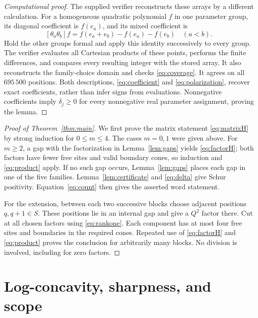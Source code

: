\documentclass[11pt]{article}
\begin{document}
\begin{proof}[Computational proof]
The supplied verifier reconstructs these arrays by a different calculation.
For a homogeneous quadratic polynomial $f$ in one parameter group,
its diagonal coefficient is $f(e_a)$, and its mixed coefficient is
\begin{equation}\label{eq:polarization}
 [\theta_a\theta_b]f=f(e_a+e_b)-f(e_a)-f(e_b)\quad(a<b).
\end{equation}
Hold the other groups formal and apply this identity successively to every
group. The verifier evaluates all Cartesian products of these points,
performs the finite differences, and compares every resulting integer
with the stored array. It also reconstructs the family-choice domain and
checks \eqref{eq:coverage}. It agrees on all $695\,500$ positions.
Both descriptions, \eqref{eq:coefficient} and \eqref{eq:polarization},
recover exact coefficients, rather than infer signs from evaluations.
Nonnegative coefficients imply $\delta_j\ge0$ for every nonnegative
real parameter assignment, proving the lemma.
\end{proof}

\begin{proof}[Proof of Theorem~\ref{thm:main}]
We first prove the matrix statement \eqref{eq:matrixH} by strong induction
for $0\le m\le4$. The cases $m=0,1$ were given above.
For $m\ge2$, a gap with the factorization in Lemma~\ref{lem:gaps}
yields \eqref{eq:factorH}; both factors have
fewer free sites and valid boundary cones, so induction and
\eqref{eq:product} apply. If no such gap occurs, Lemma~\ref{lem:gaps}
places each gap in one of the five families. Lemma~\ref{lem:certificate}
and \eqref{eq:delta} give Schur positivity.
Equation~\eqref{eq:count} then gives the asserted word statement.

For the extension, between each two successive blocks choose adjacent
positions $q,q+1\in S$. These positions lie in an internal gap and
give a $Q^2$ factor there. Cut at all chosen factors using
\eqref{eq:rankone}. Each component has at most four free sites and
boundaries in the required cones. Repeated use of
\eqref{eq:factorH} and \eqref{eq:product} proves the conclusion for
arbitrarily many blocks. No division is involved, including for zero factors.
\end{proof}

\section{Log-concavity, sharpness, and scope}
\end{document}
